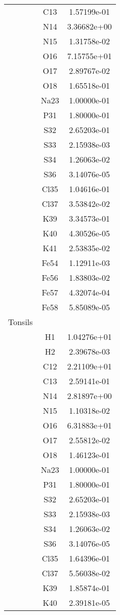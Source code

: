 \begin{centering}
\begin{longtable}{l c c}
& C13 & 1.57199e-01 \\ 
& N14 & 3.36682e+00 \\ 
& N15 & 1.31758e-02 \\ 
& O16 & 7.15755e+01 \\ 
& O17 & 2.89767e-02 \\ 
& O18 & 1.65518e-01 \\ 
& Na23 & 1.00000e-01 \\ 
& P31 & 1.80000e-01 \\ 
& S32 & 2.65203e-01 \\ 
& S33 & 2.15938e-03 \\ 
& S34 & 1.26063e-02 \\ 
& S36 & 3.14076e-05 \\ 
& Cl35 & 1.04616e-01 \\ 
& Cl37 & 3.53842e-02 \\ 
& K39 & 3.34573e-01 \\ 
& K40 & 4.30526e-05 \\ 
& K41 & 2.53835e-02 \\ 
& Fe54 & 1.12911e-03 \\ 
& Fe56 & 1.83803e-02 \\ 
& Fe57 & 4.32074e-04 \\ 
& Fe58 & 5.85089e-05 \\ 
\hline
Tonsils & & \\
\hline
& H1 & 1.04276e+01 \\ 
& H2 & 2.39678e-03 \\ 
& C12 & 2.21109e+01 \\ 
& C13 & 2.59141e-01 \\ 
& N14 & 2.81897e+00 \\ 
& N15 & 1.10318e-02 \\ 
& O16 & 6.31883e+01 \\ 
& O17 & 2.55812e-02 \\ 
& O18 & 1.46123e-01 \\ 
& Na23 & 1.00000e-01 \\ 
& P31 & 1.80000e-01 \\ 
& S32 & 2.65203e-01 \\ 
& S33 & 2.15938e-03 \\ 
& S34 & 1.26063e-02 \\ 
& S36 & 3.14076e-05 \\ 
& Cl35 & 1.64396e-01 \\ 
& Cl37 & 5.56038e-02 \\ 
& K39 & 1.85874e-01 \\ 
& K40 & 2.39181e-05 \\ 

\end{longtable}
\end{centering}
